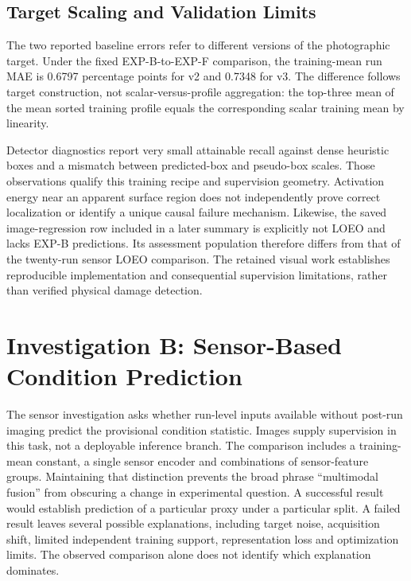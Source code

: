 \subsection{Target Scaling and Validation Limits}
The two reported baseline errors refer to different versions of the photographic target.
Under the fixed EXP-B-to-EXP-F comparison, the training-mean run MAE is 0.6797
percentage points for v2 and 0.7348 for v3. The difference follows target construction,
not scalar-versus-profile aggregation: the top-three mean of the mean sorted training
profile equals the corresponding scalar training mean by linearity.

Detector diagnostics report very small attainable recall against dense heuristic boxes
and a mismatch between predicted-box and pseudo-box scales. Those observations qualify
this training recipe and supervision geometry. Activation energy near an apparent
surface region does not independently prove correct localization or identify a unique
causal failure mechanism. Likewise, the saved image-regression row included in a later
summary is explicitly not LOEO and lacks EXP-B predictions. Its assessment population
therefore differs from that of the twenty-run sensor LOEO comparison. The retained
visual work establishes reproducible implementation and consequential supervision
limitations, rather than verified physical damage detection.

\section{Investigation B: Sensor-Based Condition Prediction}
The sensor investigation asks whether run-level inputs available without post-run
imaging predict the provisional condition statistic. Images supply supervision in this
task, not a deployable inference branch. The comparison includes a training-mean
constant, a single sensor encoder and combinations of sensor-feature groups. Maintaining
that distinction prevents the broad phrase ``multimodal fusion'' from obscuring a change
in experimental question. A successful result would establish prediction of a particular
proxy under a particular split. A failed result leaves several possible explanations,
including target noise, acquisition shift, limited independent training support,
representation loss and optimization limits. The observed comparison alone does not
identify which explanation dominates.

